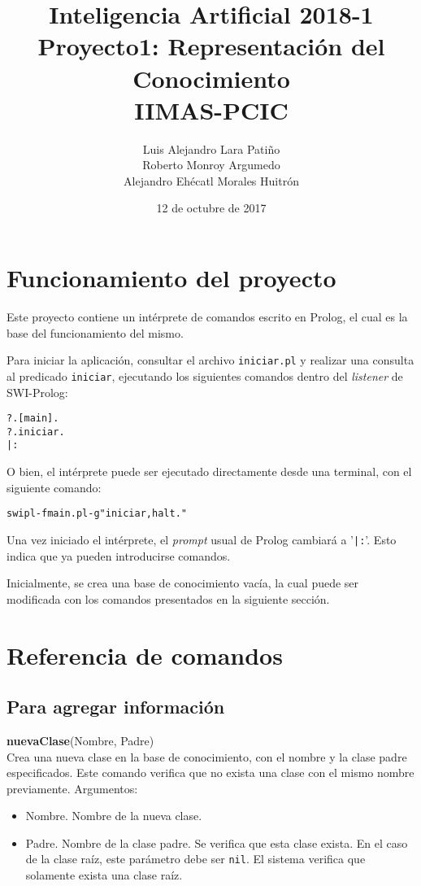 \documentclass[11pt]{article}
\title{Inteligencia Artificial 2018-1 \\ Proyecto1: Representación del Conocimiento\\
\small{IIMAS-PCIC}}
\author{Luis Alejandro Lara Patiño\\Roberto Monroy Argumedo\\
Alejandro Ehécatl Morales Huitrón}
\date{12 de octubre de 2017}
\newcommand{\bt}{\begin{alltt}}
\newcommand{\et}{\end{alltt}}
\newcommand{\comando}[2]{
    \textbf{#1}(#2)\\
}
\newenvironment{args}{
    \newline
    Argumentos:
    \begin{itemize}
}{
    \end{itemize}
    \bigskip
}
\begin{document}
\maketitle

\tableofcontents

\section{Funcionamiento del proyecto}

Este proyecto contiene un intérprete de comandos escrito en Prolog, el cual es la base del funcionamiento del mismo.

Para iniciar la aplicación, consultar el archivo \texttt{iniciar.pl} y realizar una consulta al predicado \texttt{iniciar}, ejecutando los siguientes comandos dentro del \textit{listener} de SWI-Prolog:

\bt
?. [main].
?. iniciar.
|:
\et

O bien, el intérprete puede ser ejecutado directamente desde una terminal, con el siguiente comando:

\bt
swipl -f main.pl -g "iniciar, halt."
\et

Una vez iniciado el intérprete, el \textit{prompt} usual de Prolog cambiará a '\texttt{|:}'. Esto indica que ya pueden introducirse comandos.

Inicialmente, se crea una base de conocimiento vacía, la cual puede ser modificada con los comandos presentados en la siguiente sección.

\section{Referencia de comandos}

\subsection{Para agregar información}

\comando{nuevaClase}{Nombre, Padre}
Crea una nueva clase en la base de conocimiento, con el nombre y la clase padre especificados. Este comando verifica que no exista una clase con el mismo nombre previamente.
\begin{args}
    \item Nombre. Nombre de la nueva clase.
    \item Padre. Nombre de la clase padre. Se verifica que esta clase exista. En el caso de la clase raíz, este parámetro debe ser \texttt{nil}. El sistema verifica que solamente exista una clase raíz.
\end{args}
\end{document}
